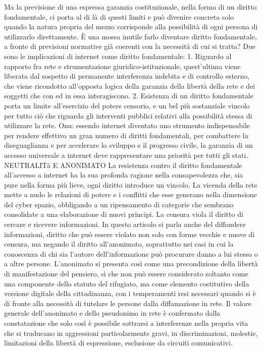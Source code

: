 Ma la previsione di una espressa garanzia costituzionale, nella forma di un diritto fondamentale, ci porta al di là di questi limiti  e può divenire concreta solo quando la natura propria del mezzo corrisponde alla possibilità di ogni persona di utilizzarlo direttamente. È una mossa inutile farlo diventare diritto fondamentale, a fronte di previsioni normative già coerenti con la necessità di cui si tratta?
Due sono le implicazioni di internet come diritto fondamentale:
1.	Riguardo al rapporto fra rete e strumentazione giuridico-istituzionale, quest’ultima viene liberata dal sospetto di permanente interferenza indebita e di controllo esterno, che viene ricondotto all’opposta logica della garanzia della libertà della rete e dei soggetti che con ed in essa interagiscono.
2.	Esistenza di un diritto fondamentale porta un limite all’esercizio del potere censorio, e un bel più sostanziale vincolo per tutto ciò che riguarda gli interventi pubblici relativi alla possibilità stessa di utilizzare la rete.
Onu: essendo internet diventato uno strumento indispensabile per rendere effettivo un gran numero di diritti fondamentali, per combattere la diseguaglianza e per accelerare lo sviluppo e il progresso civile, la garanzia di un accesso universale a internet deve rappresentare una priorità per tutti gli stati.
NEUTRALITà E ANONIMATO
La resistenza contro il diritto fondamentale all’accesso a internet ha la sua profonda ragione nella consapevolezza che, sia pure nella forma più lieve, ogni diritto introduce un vincolo. La vicenda della rete mette a nudo le relazioni di potere e i conflitti che esse generano nella dimensione del cyber spazio, obbligando a un ripensamento di categorie che sembrano consolidate a una elaborazione di nuovi principi.
La censura viola il diritto di cercare e ricevere informazioni. In questo articolo si parla anche del diffondere informazioni, diritto che può essere violato non solo con forme vecchie e nuove di censura, ma negando il diritto all’anonimato, soprattutto nei casi in cui la conoscenza di chi sia l’autore dell’informazione può procurare danno a lui stesso o a altre persone.
L’anonimato si presenta così come una precondizione della libertà di manifestazione del pensiero, sì che non può essere considerato soltanto come una componente dello statuto del rifugiato, ma come elemento costitutivo della versione digitale della cittadinanza, con i temperamenti resi necessari quando si è di fronte alla necessità di tutelare le persone dalla diffamazione in rete. Il valore generale dell’anonimato e dello pseudonimo in rete è confermato dalla constatazione che solo così è possibile sottrarsi a interferenze nella propria vita che si traducano in aggressioni particolarmente gravi, in discriminazioni, molestie, limitazioni della libertà di espressione, esclusione da circuiti comunicativi.
